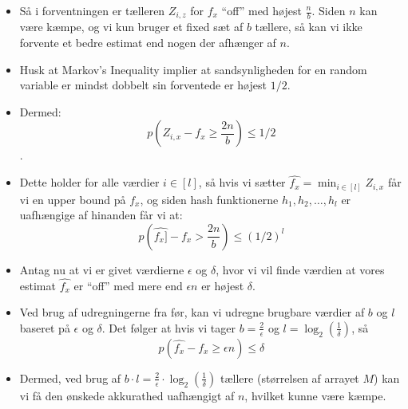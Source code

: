 \documentclass{beamer}
\begin{document}
\begin{frame}[allowframebreaks]
\begin{itemize}
\item Så i forventningen er tælleren $Z_{i,z}$ for $f_{x}$ ``off'' med højest $\frac{n}{b}$. Siden $n$ kan være kæmpe, og vi kun bruger et fixed sæt af $b$ tællere, så kan vi ikke forvente et bedre estimat end nogen der afhænger af $n$. 
\item Husk at Markov's Inequality implier at sandsynligheden for en random variable er mindst dobbelt sin forventede er højest $1/2$. 
\item Dermed: \[ p(Z_{i,x} - f_{x} \geq \frac{2n}{b}) \leq 1/2 \].
\item Dette holder for alle værdier $i \in [l]$, så hvis vi sætter $\hat{f_{x}} = \min_{i\in [l]} Z_{i,x}$ får vi en upper bound på $f_{x}$, og siden hash funktionerne $h_1, h_{2}, \ldots, h_{l}$ er uafhængige af hinanden får vi at: \[ p(\hat{f_{x}]} - f_{x} > \frac{2n}{b}) \leq (1/2)^{l} \]
\item Antag nu at vi er givet værdierne $\epsilon$ og $\delta$, hvor vi vil finde værdien at vores estimat $\hat{f_{x}}$ er ``off'' med mere end $\epsilon n$ er højest $\delta$. 
\item Ved brug af udregningerne fra før, kan vi udregne brugbare værdier af $b$ og $l$ baseret på $\epsilon$ og $\delta$. Det følger at hvis vi tager $b = \frac{2}{\epsilon}$ og $l = \log_{2} \left( \frac{1}{\delta} \right)$, så \[ p(\hat{f_{x}} - f_{x} \geq \epsilon n) \leq \delta \]
\item Dermed, ved brug af $b \cdot l = \frac{2}{\epsilon} \cdot \log_{2} \left( \frac{1}{\delta} \right)$ tællere (størrelsen af arrayet $M$) kan vi få den ønskede akkurathed uafhængigt af $n$, hvilket kunne være kæmpe. 
\end{itemize}
\end{frame}
\end{document}
